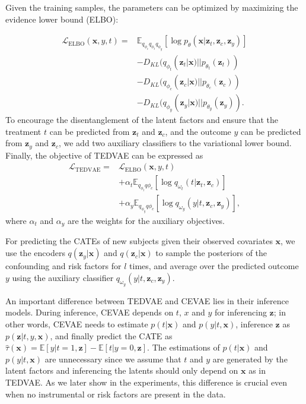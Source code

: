 \documentclass[letterpaper]{article} %
\begin{document}
Given the training samples, the parameters can be optimized by maximizing the evidence lower bound (ELBO):

\begin{align}
\mathcal{L}_{\textrm{ELBO}}(\mathbf{x},y,t) = & \mathbb{E}_{q_{\phi_c}{q_{\phi_t}}{q_{\phi_y}}} [\log p_\theta (\mathbf{x}|\mathbf{z}_t, \mathbf{z}_c, \mathbf{z}_y)] \nonumber\\
& -  D_{KL} (q_{\phi_t}(\mathbf{z}_t|\mathbf{x})|| p_{\theta_t}(\mathbf{z}_t)) \nonumber\\
& -  D_{KL} (q_{\phi_c}(\mathbf{z}_c|\mathbf{x})|| p_{\theta_c}(\mathbf{z}_c)) \nonumber\\
& -  D_{KL} (q_{\phi_y}(\mathbf{z}_y|\mathbf{x})|| p_{\theta_y}(\mathbf{z}_y)).
\end{align}
To  encourage the disentanglement of the latent factors and ensure that the treatment $t$ can be predicted from $\mathbf{z}_t$ and $\mathbf{z}_c$, and the outcome $y$ can be predicted from $\mathbf{z}_y$ and $\mathbf{z}_c$,  we add two auxiliary classifiers to the variational lower bound. Finally, the objective of TEDVAE can be expressed as
\begin{align}
\mathcal{L}_{\text{TEDVAE}} = & \mathcal{L}_{\textrm{ELBO}}(\mathbf{x},y,t)\nonumber\\
& + \alpha_t \mathbb{E}_{q_{\phi_{t}} q\phi_{c}} [\log q_{\omega_t}(t|\mathbf{z}_t,\mathbf{z}_c)]\nonumber \\
&+  \alpha_y \mathbb{E}_{q_{\phi_{y}} q\phi_{c}} [\log q_{\omega_y}(y|t, \mathbf{z}_c, \mathbf{z}_y)],
\label{loss_function}
\end{align}
where $\alpha_t$ and $\alpha_y$ are the weights for the auxiliary objectives.

For predicting the CATEs of new subjects given their observed covariates $\mathbf{x}$, we use the encoders $q(\mathbf{z}_y|\mathbf{x})$ and $q(\mathbf{z}_c|\mathbf{x})$ to sample the posteriors of the confounding and risk factors for $l$ times, and average over the predicted outcome $y$ using the auxiliary classifier $q_{\omega_y}(y|t, \mathbf{z}_c, \mathbf{z}_y)$.

An important difference between TEDVAE and CEVAE lies in their inference models.
During inference, CEVAE depends on $t$, $x$ and $y$ for inferencing $\mathbf{z}$; in other words, CEVAE needs to estimate $p(t|\mathbf{x})$ and $p(y|t,\mathbf{x})$, inference $\mathbf{z}$ as $p(\mathbf{z}|t,y,\mathbf{x})$, and finally predict the CATE as $\hat{\tau} (\mathbf{x}) = \mathbb{E}[y|t=1,\mathbf{z}] - \mathbb{E}[t|y=0, \mathbf{z}]$.
The estimations of $p(t|\mathbf{x})$ and $p(y|t,\mathbf{x})$ are unnecessary since we assume that $t$ and $y$ are generated by the latent factors and inferencing the latents should only depend on $\mathbf{x}$ as in TEDVAE.
As we later show in the experiments, this difference is crucial even when no instrumental or risk factors are present in the data.
\end{document}
